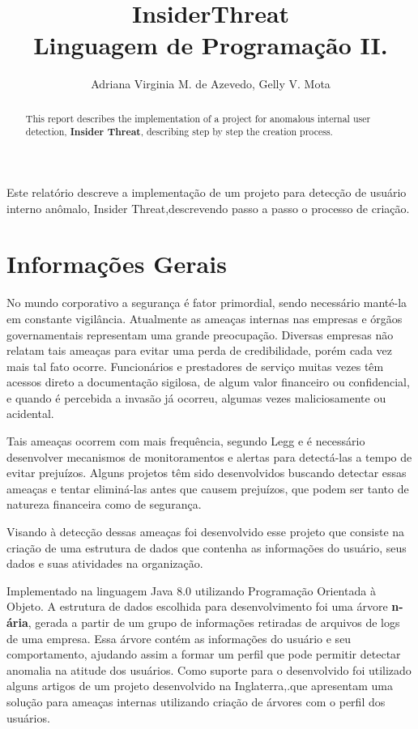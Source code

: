 \documentclass[12pt]{article}
\title{InsiderThreat\\ Linguagem de Programação II.}
\author{Adriana Virginia M. de Azevedo\inst{1}, Gelly V. Mota\inst{1}}
\begin{document}
 

\maketitle

\begin{abstract}
  This report describes the implementation of a project for anomalous internal user 	  detection, {\bf Insider Threat}\rm, describing step by step the creation process.
  
\end{abstract}
     
\begin{resumo} 
  Este relatório descreve a implementação de um projeto para detecção de usuário interno  anômalo, Insider Threat,descrevendo passo a passo o processo de criação.
\end{resumo}


\section{Informações Gerais}

No mundo corporativo a segurança é fator primordial, sendo necessário manté-la em constante vigilância. Atualmente as ameaças internas nas empresas e órgãos governamentais representam uma grande preocupação.  Diversas  empresas não relatam tais ameaças para evitar uma perda de credibilidade, porém cada vez mais tal fato ocorre. Funcionários e prestadores de serviço muitas vezes têm acessos direto a documentação sigilosa, de algum valor financeiro ou confidencial, e quando é percebida a invasão já ocorreu, algumas vezes  maliciosamente ou acidental. 

Tais ameaças ocorrem com mais frequência, segundo Legg e é necessário desenvolver mecanismos de monitoramentos e alertas para detectá-las a tempo de evitar prejuízos.  Alguns projetos têm sido desenvolvidos buscando detectar essas ameaças e tentar eliminá-las antes que causem prejuízos, que podem ser tanto de natureza financeira como de segurança.

Visando à detecção dessas ameaças foi desenvolvido esse projeto que consiste na criação de uma  estrutura de dados que contenha as informações do usuário, seus dados e suas atividades na organização. 

Implementado na linguagem Java 8.0 utilizando Programação Orientada à Objeto. A estrutura de dados escolhida para desenvolvimento foi uma árvore \textbf{n-ária}, gerada a partir de um grupo de informações retiradas de arquivos de logs de uma empresa. Essa árvore contém as informações do usuário e seu comportamento, ajudando assim a formar um perfil que pode permitir detectar anomalia na atitude dos usuários. Como suporte para o desenvolvido foi utilizado alguns artigos de um projeto desenvolvido na Inglaterra,.que apresentam uma solução para ameaças internas utilizando criação de árvores com o perfil dos usuários.
\end{document}
